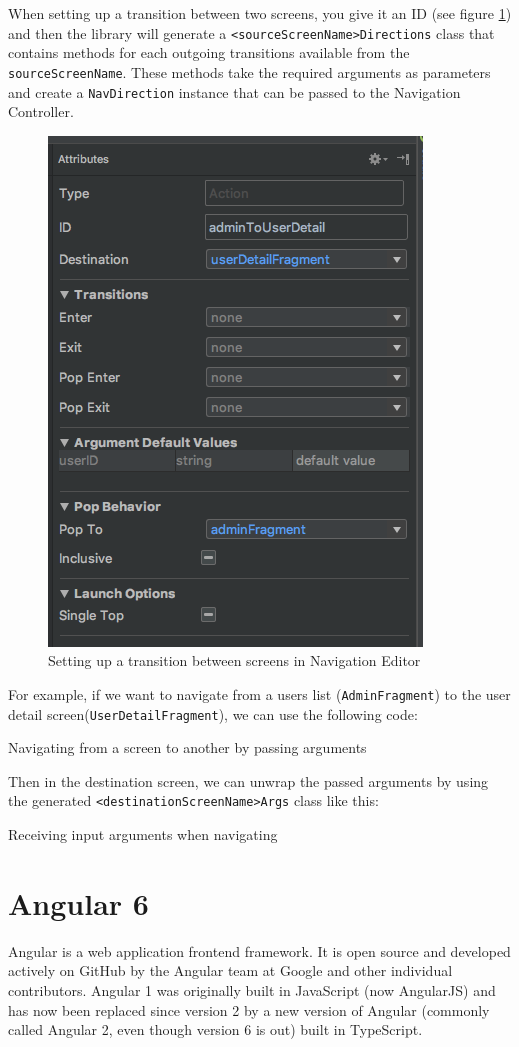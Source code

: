 \documentclass[twoside, openright,11pt,a4paper]{book}
\newenvironment{code}{\captionsetup{type=listing}}{}
\begin{document}
When setting up a transition between two screens, you give it an ID (see figure \ref{transition_nav}) and then the library will generate a \verb+<sourceScreenName>Directions+ class that contains methods for each outgoing transitions available from the \verb+sourceScreenName+. These methods take the required arguments as parameters and create a \verb+NavDirection+ instance that can be passed to the Navigation Controller.
\begin{figure}[H]
\begin{center}
	\includegraphics[width=.5\textwidth]{assets/transition_nav}
	\caption[Transition between screens]{Setting up a transition between screens in Navigation Editor}
	\label{transition_nav}
\end{center}
\end{figure}

For example, if we want to navigate from a users list (\verb+AdminFragment+) to the user detail screen(\verb+UserDetailFragment+), we can use the following code:
\begin{code}
	\caption{Navigating from a screen to another by passing arguments}
\end{code}

Then in the destination screen, we can unwrap the passed arguments by using the generated \verb+<destinationScreenName>Args+ class like this:
\begin{code}
	\caption{Receiving input arguments when navigating}
\end{code}

\section{Angular 6}
\label{angular_chapter}
Angular\cite{angular:website} is a web application frontend framework. It is open source and developed actively on GitHub\cite{github:angular} by the Angular team at Google and other individual contributors. Angular 1 was originally built in JavaScript (now AngularJS) and has now been replaced since version 2 by a new version of Angular (commonly called Angular 2, even though version 6 is out) built in TypeScript. \\
\end{document}
